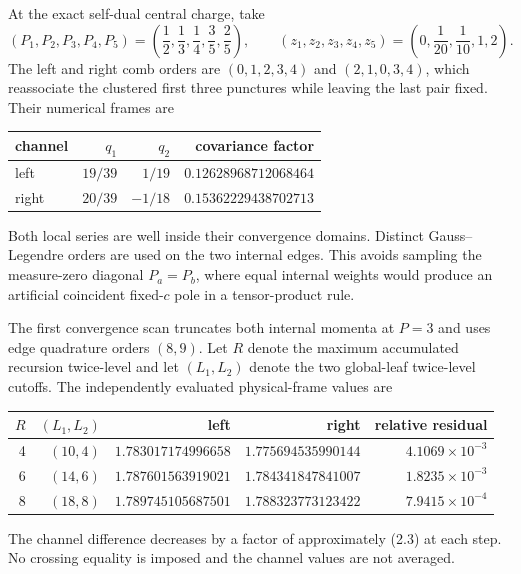 \documentclass[11pt]{article}
\begin{document}
At the exact self-dual central charge, take
\begin{equation}
 (P_1,P_2,P_3,P_4,P_5)
 =\left(\frac12,\frac13,\frac14,\frac35,\frac25\right),
 \qquad
 (z_1,z_2,z_3,z_4,z_5)
 =\left(0,\frac1{20},\frac1{10},1,2\right).
 \label{eq:fivepoint-crossing-numerical-point}
\end{equation}
The left and right comb orders are \((0,1,2,3,4)\) and
\((2,1,0,3,4)\), which reassociate the clustered first three punctures
while leaving the last pair fixed.  Their numerical frames are
\begin{center}
\small
\begin{tabular}{@{}lrrr@{}}
\toprule
channel & \(q_1\) & \(q_2\) & covariance factor\\
\midrule
left  & \(19/39\) & \(1/19\)  & \(0.12628968712068464\)\\
right & \(20/39\) & \(-1/18\) & \(0.15362229438702713\)\\
\bottomrule
\end{tabular}
\end{center}
Both local series are well inside their convergence domains.  Distinct
Gauss--Legendre orders are used on the two internal edges.  This avoids
sampling the measure-zero diagonal \(P_a=P_b\), where equal internal weights
would produce an artificial coincident fixed-\(c\) pole in a tensor-product
rule.

The first convergence scan truncates both internal momenta at \(P=3\) and
uses edge quadrature orders \((8,9)\).  Let \(R\) denote the maximum
accumulated recursion twice-level and let \((L_1,L_2)\) denote the two
global-leaf twice-level cutoffs.  The independently evaluated physical-frame
values are
\begin{center}
\small
\begin{tabular}{@{}rrrrr@{}}
\toprule
\(R\) & \((L_1,L_2)\) & left & right & relative residual\\
\midrule
4 & \((10,4)\) & \(1.783017174996658\) & \(1.775694535990144\)
  & \(4.1069\times10^{-3}\)\\
6 & \((14,6)\) & \(1.787601563919021\) & \(1.784341847841007\)
  & \(1.8235\times10^{-3}\)\\
8 & \((18,8)\) & \(1.789745105687501\) & \(1.788323773123422\)
  & \(7.9415\times10^{-4}\)\\
\bottomrule
\end{tabular}
\end{center}
The channel difference decreases by a factor of approximately (2.3) at
each step.  No crossing equality is imposed and the channel values are not
averaged.
\end{document}
